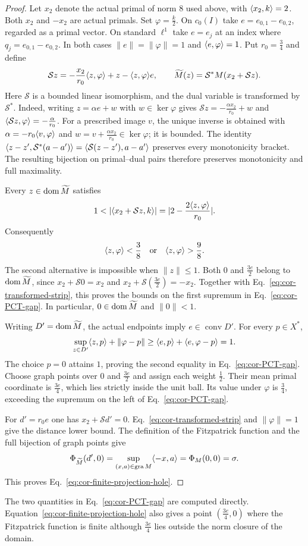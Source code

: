 \begin{proof}
Let $x_2$ denote the actual primal of norm $8$ used above, with
$\langle x_2,k\rangle=2$. Both $x_2$ and $-x_2$ are actual primals.
Set $\varphi=\frac{k}{2}$. On $c_0(I)$ take
$e=e_{0,1}-e_{0,2}$, regarded as a primal vector. On standard
$\ell^1$ take $e=e_j$ at an index where
$q_j=e_{0,1}-e_{0,2}$. In both cases
$\|e\|=\|\varphi\|=1$ and $\langle e,\varphi\rangle=1$.
Put $r_0=\frac{3}{4}$ and define
\[
\mathcal S z=-\frac{x_2}{r_0}\langle z,\varphi\rangle
                 +z-\langle z,\varphi\rangle e,
\qquad
\widetilde M(z)=\mathcal S^*M(x_2+\mathcal S z).
\]
Here $\mathcal S$ is a bounded linear isomorphism, and the dual variable
is transformed by $\mathcal S^*$. Indeed, writing $z=\alpha e+w$ with $w\in\ker\varphi$
gives $\mathcal S z=-\frac{\alpha x_2}{r_0}+w$ and
$\langle \mathcal S z,\varphi\rangle=-\frac{\alpha}{r_0}$. For a prescribed
image $v$, the unique inverse is obtained with
$\alpha=-r_0\langle v,\varphi\rangle$ and
$w=v+\frac{\alpha x_2}{r_0}\in\ker\varphi$; it is bounded.
The identity $\langle z-z',\mathcal S^*(a-a')\rangle
=\langle \mathcal S(z-z'),a-a'\rangle$ preserves every monotonicity bracket.
The resulting bijection on primal--dual pairs therefore preserves
monotonicity and full maximality.

Every $z\in\operatorname{dom}\widetilde M$ satisfies
\[
1<|\pair{x_2+\mathcal S z}{k}|
  =|2-\frac{2\pair{z}{\varphi}}{r_0}|.
\]
Consequently
\begin{equation}
\langle z,\varphi\rangle<\frac38
\quad\text{or}\quad
\langle z,\varphi\rangle>\frac98.
\label{eq:cor-transformed-strip}
\end{equation}
The second alternative is impossible when $\|z\|\le1$.
Both $0$ and $\frac{3e}{2}$ belong to $\operatorname{dom}\widetilde M$, since
$x_2+\mathcal S0=x_2$ and $x_2+\mathcal S(\frac{3e}{2})=-x_2$.
Together with Eq.~\eqref{eq:cor-transformed-strip}, this proves the bounds
on the first supremum in Eq.~\eqref{eq:cor-PCT-gap}. In particular,
$0\in\operatorname{dom}\widetilde M$ and $\|0\|<1$.

Writing $D'=\operatorname{dom}\widetilde M$, the actual endpoints imply
$e\in\operatorname{conv}D'$. For every $p\in X^*$,
\[
\sup_{z\in D'}\langle z,p\rangle+\|\varphi-p\|
\ge\langle e,p\rangle+\langle e,\varphi-p\rangle=1.
\]
The choice $p=0$ attains $1$, proving the second equality in
Eq.~\eqref{eq:cor-PCT-gap}. Choose graph points over $0$ and $\frac{3e}{2}$
and assign each weight $\frac{1}{2}$. Their mean primal coordinate is $\frac{3e}{4}$,
which lies strictly inside the unit ball. Its value under $\varphi$
is $\frac{3}{4}$, exceeding the supremum on the left of
Eq.~\eqref{eq:cor-PCT-gap}.

For $d'=r_0e$ one has $x_2+\mathcal S d'=0$.
Eq.~\eqref{eq:cor-transformed-strip} and $\|\varphi\|=1$
give the distance lower bound. The definition of the Fitzpatrick
function and the full bijection of graph points give
\[
\Phi_{\widetilde M}(d',0)
=\sup_{(x,a)\in\operatorname{gra} M}\langle -x,a\rangle
=\Phi_M(0,0)=\sigma.
\]
This proves Eq.~\eqref{eq:cor-finite-projection-hole}.
\end{proof}
The two quantities in Eq.~\eqref{eq:cor-PCT-gap} are computed directly.
Equation~\eqref{eq:cor-finite-projection-hole} also gives a point
$(\frac{3e}{4},0)$ where the Fitzpatrick function is finite although $\frac{3e}{4}$
lies outside the norm closure of the domain.

